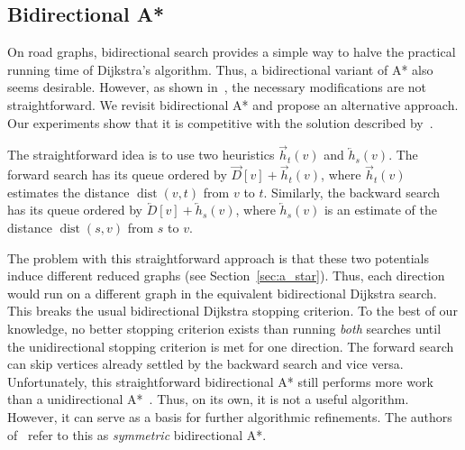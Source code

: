 \documentclass[manuscript,review]{acmart}
\newcommand*{\dist}{\operatorname{dist}}
\begin{document}
\subsection{Bidirectional A*}\label{sec:bidir_astar}

On road graphs, bidirectional search provides a simple way to halve the practical running time of Dijkstra's algorithm.
Thus, a bidirectional variant of A*  also seems desirable.
However, as shown in~\cite{gh-cspas-05}, the necessary modifications are not straightforward.
We revisit bidirectional A* and propose an alternative approach.
Our experiments show that it is competitive with the solution described by~\cite{gh-cspas-05}.

The straightforward idea is to use two heuristics $\overrightarrow{h}_t(v)$ and $\overleftarrow{h}_s(v)$.
The forward search has its queue ordered by $\overrightarrow{D}[v] + \overrightarrow{h}_t(v)$, where $\overrightarrow{h}_t(v)$ estimates the distance $\dist(v,t)$ from $v$ to $t$.
Similarly, the backward search has its queue ordered by $\overleftarrow{D}[v] + \overleftarrow{h}_s(v)$, where $\overleftarrow{h}_s(v)$ is an estimate of the distance $\dist(s,v)$ from $s$ to $v$.

The problem with this straightforward approach is that these two potentials induce different reduced graphs (see Section~\ref{sec:a_star}).
Thus, each direction would run on a different graph in the equivalent bidirectional Dijkstra search.
This breaks the usual bidirectional Dijkstra stopping criterion.
To the best of our knowledge, no better stopping criterion exists than running \emph{both} searches until the unidirectional stopping criterion is met for one direction.
The forward search can skip vertices already settled by the backward search and vice versa.
Unfortunately, this straightforward bidirectional A* still performs more work than a unidirectional A*~\cite{gh-cspas-05}.
Thus, on its own, it is not a useful algorithm.
However, it can serve as a basis for further algorithmic refinements.
The authors of~\cite{gh-cspas-05} refer to this as \emph{symmetric} bidirectional A*.
\end{document}
